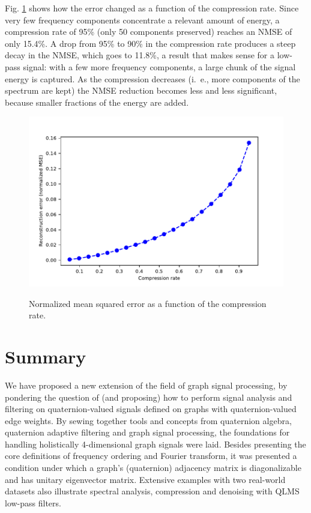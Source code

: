 Fig. \ref{fig:mse_values} shows how the error changed as a function of the compression rate. Since very few frequency components concentrate a relevant amount of energy, a compression rate of 95\% (only 50 components preserved) reaches an NMSE of only 15.4\%. A drop from 95\% to 90\% in the compression rate produces a steep decay in the NMSE, which goes to 11.8\%, a result that makes sense for a low-pass signal: with a few more frequency components, a large chunk of the signal energy is captured. As the compression decreases (i.~e., more components of the spectrum are kept) the NMSE reduction becomes less and less significant, because smaller fractions of the energy are added.

\begin{figure}
    \centering
    \caption{Normalized mean squared error as a function of the compression rate.}
    \includegraphics[width=0.7\linewidth]{Figures/usa_example/mse_values.pdf}
    \floatsource
    \label{fig:mse_values}
\end{figure}

\section{Summary}

We have proposed a new extension of the field of graph signal processing, by pondering the question of (and proposing) how to perform signal analysis and filtering on quaternion-valued signals defined on graphs with quaternion-valued edge weights. By sewing together tools and concepts from quaternion algebra, quaternion adaptive filtering and graph signal processing, the foundations for handling holistically 4-dimensional graph signals were laid. Besides presenting the core definitions of frequency ordering and Fourier transform,
it was presented a condition under which a graph's (quaternion) adjacency matrix is diagonalizable and has unitary eigenvector matrix. Extensive examples with two real-world datasets also illustrate spectral analysis, compression and denoising with QLMS low-pass filters.

